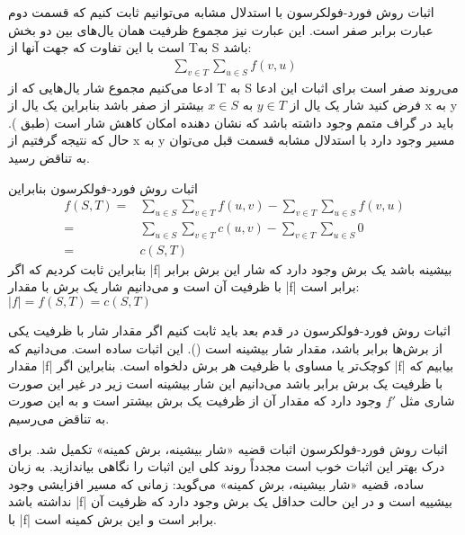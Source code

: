 \begin{itemframe}{اثبات روش فورد-فولکرسون}
\itm
با استدلال مشابه می‌توانیم ثابت کنیم که قسمت دوم عبارت برابر صفر است. این عبارت نیز مجموع ظرفیت همان یال‌های بین دو بخش است با این تفاوت که جهت آنها از T‌به S باشد:
\begin{align*}
\sum_{v \in T} \sum_{u \in S} f(v, u)
\end{align*}
\itm
ادعا می‌کنیم مجموع شار یال‌هایی که از T به S می‌روند صفر است
\itm
برای اثبات این ادعا فرض کنید شار یک یال از
$y \in T$
به
$x \in S$
بیشتر از صفر باشد بنابراین یک یال از x به y باید در گراف متمم وجود داشته باشد که نشان دهنده امکان کاهش شار است (طبق ). حال که نتیجه گرفتیم از x به y مسیر وجود دارد با استدلال مشابه قسمت قبل می‌توان به تناقض رسید.
\end{itemframe}

\begin{itemframe}{اثبات روش فورد-فولکرسون}
\itm
بنابراین
\begin{align*}
f(S, T) = & \sum_{u \in S} \sum_{v \in T} f(u, v) - \sum_{v \in T} \sum_{u \in S} f(v, u)\\
= & \sum_{u \in S} \sum_{v \in T} c(u, v) - \sum_{v \in T} \sum_{u \in S} 0\\
= & c(S, T)
\end{align*}
\itm
بنابراین ثابت کردیم که اگر |f| بیشینه باشد یک برش وجود دارد که شار این برش برابر با ظرفیت آن است و می‌دانیم شار یک برش با مقدار |f| برابر است:
$|f| = f(S,T) = c(S, T)$

\end{itemframe}
\begin{itemframe}{اثبات روش فورد-فولکرسون}
\itm
در قدم بعد باید ثابت کنیم اگر مقدار شار با ظرفیت یکی از برش‌ها برابر باشد، مقدار شار بیشینه است ().
\itm
این اثبات ساده است. می‌دانیم که مقدار |f| کوچک‌تر یا مساوی با ظرفیت هر برش دلخواه است. بنابراین اگر |f| بیابیم که با ظرفیت یک برش برابر باشد می‌دانیم این شار بیشینه است زیر در غیر این صورت شاری مثل
$f'$
وجود دارد که مقدار آن از ظرفیت یک برش بیشتر است و به این صورت به تناقض می‌رسیم.

\end{itemframe}
\begin{itemframe}{اثبات روش فورد-فولکرسون}
\itm
اثبات قضیه «شار بیشینه، برش کمینه» تکمیل شد. برای درک بهتر این اثبات خوب است مجدداً روند کلی این اثبات را نگاهی بیاندازید.
\itm
به زبان ساده، قضیه «شار بیشینه، برش کمینه» می‌گوید: زمانی که مسیر افزایشی وجود نداشته باشد |f| بیشییه است و در این حالت حداقل یک برش وجود دارد که ظرفیت آن با |f| برابر است و این برش کمینه است.
\end{itemframe}
